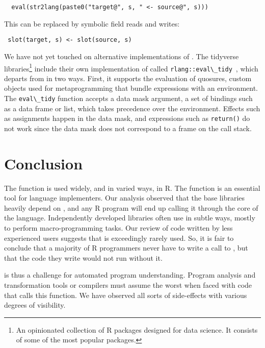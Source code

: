 \documentclass[acmsmall, screen]{acmart}
\renewcommand{\k}[1]{\lstinline |#1|\xspace}
\begin{document}
\begin{lstlisting}
  eval(str2lang(paste0("target@", s, " <- source@", s)))
\end{lstlisting}


This can be replaced by symbolic field reads and writes:

\begin{lstlisting}
 slot(target, s) <- slot(source, s)
\end{lstlisting}


We have not yet touched on alternative implementations of \eval. The tidyverse
libraries\footnote{An opinionated collection of R packages designed for data
  science. It consists of some of the most popular packages.} include their own
implementation of \eval called \k{rlang::eval\_tidy}~\cite{tidyverse}, which
departs from \eval in two ways. First, it supports the evaluation of quosures,
custom objects used for metaprogramming that bundle expressions with an
environment. The \k{eval\_tidy} function accepts a data mask argument, a set of
bindings such as a data frame or list, which takes precedence over the
environment. Effects such as assignments happen in the data mask, and
expressions such as \k{return()} do not work since the data mask does not
correspond to a frame on the call stack.

\section{Conclusion}

The \eval function is used widely, and in varied ways, in R. The function is an
essential tool for language implementers. Our analysis observed that the base
libraries heavily depend on \eval, and any R program will end up calling it
through the core of the language. Independently developed libraries often use
\eval in subtle ways, mostly to perform macro-programming tasks. Our review of
code written by less experienced users suggests that \eval is exceedingly rarely
used. So, it is fair to conclude that a majority of R programmers never have to
write a call to \eval, but that the code they write would not run without it.

\Eval is thus a challenge for automated program understanding. Program analysis
and transformation tools or compilers must assume the worst when faced with code
that calls this function. We have observed all sorts of side-effects with
various degrees of visibility.
\end{document}
